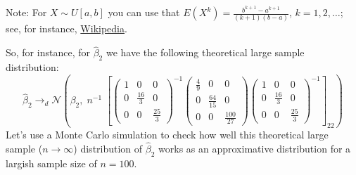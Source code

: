 \documentclass[
  14pt,
]{memoir}
\begin{document}
Note: For \(X\sim U[a,b]\) you can use that \(E(X^k)=\frac{b^{k+1}-a^{k+1}}{(k+1)(b-a)}\), \(k=1,2,\dots\); see, for instance, \href{https://en.wikipedia.org/wiki/Continuous_uniform_distribution}{Wikipedia}.

So, for instance, for \(\hat{\beta}_2\) we have the following theoretical large sample distribution:
\[
\hat\beta_2\to_d\mathcal{N}\left(\beta_2, \;n^{-1}\;\left[\left(\begin{matrix}1&0&0\\0&\frac{16}{3}&0\\0&0&\frac{25}{3}\end{matrix}\right)^{-1}\left(\begin{matrix}\frac{4}{9}&0&0\\0&\frac{64}{15}&0\\0&0&\frac{100}{27}\end{matrix}\right)\left(\begin{matrix}1&0&0\\0&\frac{16}{3}&0\\0&0&\frac{25}{3}\end{matrix}\right)^{-1}\right]_{22}\right)
\]
Let's use a Monte Carlo simulation to check how well this theoretical large sample (\(n\to\infty\)) distribution of \(\hat\beta_2\) works as an approximative distribution for a largish sample size of \(n=100\).
\end{document}
